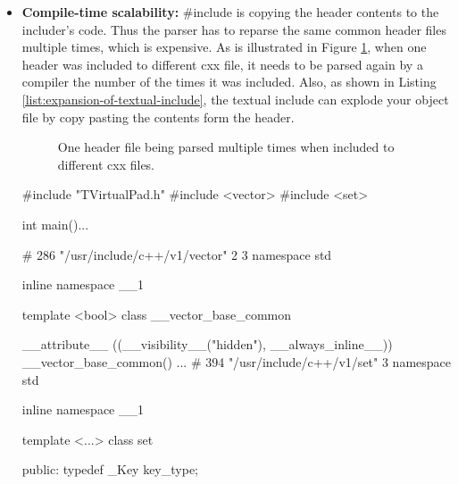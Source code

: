 \documentclass{webofc}
\begin{document}
\begin{itemize}
    \item \textbf{Compile-time scalability:}
    \#include is copying the header contents to the includer's code. Thus the parser has to reparse the same common header files multiple times, which is expensive. As is illustrated in Figure \ref{fig:textual_include}, when one header was included to different cxx file, it needs to be parsed again by a compiler the number of the times it was included. Also, as shown in Listing \ref{list:expansion-of-textual-include}, the textual include can explode your object file by copy pasting the contents form the header.
    
\begin{figure}
\centering
    \begin{minipage}{.3\textwidth}
    \end{minipage}
\caption{One header file being parsed multiple times when included to different cxx files.}
\label{fig:textual_include}

\end{figure}
    \begin{listing}[h]
    \noindent
    \begin{minipage}[h]{.45\textwidth}
    \begin{cppcode*}{}
    #include "TVirtualPad.h"
    #include <vector>
    #include <set>

    int main(){...}
    \end{cppcode*}
    \end{minipage}\hfill
    \begin{minipage}[h]{.52\textwidth}
    \begin{cppcode*}
    # 286 "/usr/include/c++/v1/vector" 2 3
    namespace std { inline namespace __1 {
    template <bool> class __vector_base_common {
       __attribute__ ((__visibility__("hidden"),
       __always_inline__))
       __vector_base_common() {}
    ...
    # 394 "/usr/include/c++/v1/set" 3
    namespace std {inline namespace __1 {
    template <...> class set {
    public:
        typedef _Key key_type;

}}}}}}
\end{cppcode*}
\end{minipage}
\end{listing}
\end{itemize}
\end{document}
